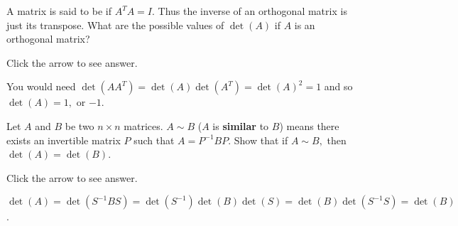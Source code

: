 \documentclass{ximera}
\begin{document}
\begin{problem}\label{prb:7.19}A matrix is said to be  if
$A^{T}A=I.$ Thus the inverse of an orthogonal matrix is just its transpose.
What are the possible values of $\det \left( A\right) $ if $A$ is an
orthogonal matrix?

Click the arrow to see answer.
\begin{expandable}
You would need $\det \left( AA^{T}\right) =\det
\left( A\right) \det \left( A^{T}\right) =\det \left( A\right) ^{2}=1$ and
so $\det \left( A\right) =1,$ or $-1$.
\end{expandable}
\end{problem}

\begin{problem}\label{prb:7.20} Let $A$ and $B$ be two $n\times n$ matrices. $A\sim B$
($A$ is \textbf{similar} to $B$) means there exists an invertible matrix $P$
such that $A=P^{-1}BP.$ Show that if $A\sim B,$ then
$\det \left( A\right) =\det \left( B\right)$.

Click the arrow to see answer.
\begin{expandable}
$\det \left( A\right) =\det
\left( S^{-1}BS\right) =\det \left( S^{-1}\right) \det \left( B\right) \det
\left( S\right) =\det \left( B\right) \det \left( S^{-1}S\right) =\det
\left( B\right) $.
\end{expandable}
\end{problem}
\end{document}

